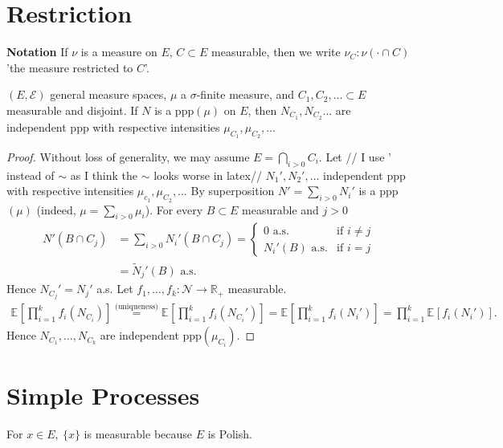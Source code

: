 \section{Restriction}
\noindent \textbf{Notation} If $\nu $ is a measure on $E$, $C \subset E$ measurable, then we write $\nu _C: \nu(\cdot \cap C)$ 'the measure restricted to $C$'.
\begin{theorem}[Restriction]
	$(E, \mathcal{E})$ general measure spaces, $\mu $ a $\sigma $-finite measure, and $C_1, C_2, \ldots  \subset E$ measurable and disjoint. If $N$ is a  ppp$(\mu)$ on  $E$, then $N_{C_1}, N_{C_2} \ldots $ are independent ppp with respective intensities $\mu_{C_1}, \mu_{C_2}, \ldots $	
\end{theorem}
\begin{proof}
	Without loss of generality, we may assume $E = \bigcap_{i> 0}C_i$. Let {\color{blue}// I use ' instead of $\sim$ as I think the $\sim$ looks worse in latex//} $N_1', N_2', \ldots$ independent ppp with respective intensities $\mu _{c_1}, \mu _{C_2},\ldots$ By superposition $N' = \sum_{i> 0}^{} N_i'$ is a ppp$(\mu )$ (indeed, $\mu = \sum_{i> 0}^{} \mu _i$). For every $B\subset E$ measurable and $j> 0$ 
	\begin{align}
		N'(B \cap C_j) &= \sum_{i> 0}^{} N_i'(B \cap C_j) =
		\begin{cases}
			0 \textrm{ a.s.} & \textrm{if }i \neq j \\
			N_i'(B) \textrm{ a.s.} & \textrm{if } i=j
		\end{cases} \\
			       &= \widetilde{N}_j'(B) \textrm{ a.s.}	
	\end{align}
Hence $N_{C_j}' = N_j'$ a.s. Let $f_1, \ldots, f_k: \mathcal{N} \to \mathbb{R}_+$ measurable. 
\begin{align}
	\mathbb{E}_{} \left[ \prod_{i=1}^{k}f_i(N_{C_i}) \right]  \stackrel{\textrm{(uniqueness)}}{=} 
	\mathbb{E}_{} \left[ \prod_{i=1}^{k}f_i(N_{C_i}') \right] = \mathbb{E}_{} \left[ \prod_{i=1}^{k}f_i(N_i') \right]= \prod_{i=1}^{k}\mathbb{E}_{} \left[ f_i(N_i') \right] . 
\end{align}
Hence $N_{C_1}, \ldots, N_{C_k}$ are independent ppp$(\mu _{C_i})$.
\end{proof}



\section{Simple Processes}
{\color{blue}
\begin{rmk}[]
	For $x \in E,\ \{x\}$ is measurable because $E$ is Polish.
\end{rmk}}

